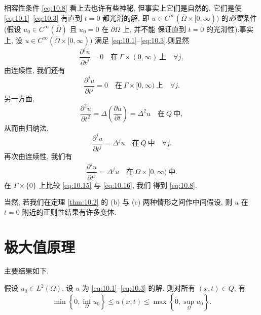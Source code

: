 \begin{remark}
\label{rem:10.4}
相容性条件 \eqref{eq:10.8} 看上去也许有些神秘, 但事实上它们是自然的.
它们是使 \eqref{eq:10.1}--\eqref{eq:10.3} 有直到 $t=0$ 都光滑的解, 即
$u\in C^\infty(\overline\Omega\times[0,\infty))$ 的\emph{必要}条件 (假设
$u_0\in C^\infty(\overline\Omega)$ 且 $u_0=0$ 在 $\partial\Omega$ 上, 并不能
保证直到 $t=0$ 的光滑性).事实上, 设 $u\in C^\infty(\overline\Omega\times
[0,\infty))$ 满足 \eqref{eq:10.1}--\eqref{eq:10.3}.则显然
\begin{equation}
\frac{\partial^ju}{\partial t^j}=0
\quad\text{在}\ \Gamma\times(0,\infty)\ \text{上}\quad\forall j,
\label{eq:10.15}
\end{equation}
由连续性, 我们还有
\begin{equation*}
\frac{\partial^ju}{\partial t^j}=0
\quad\text{在}\ \Gamma\times[0,\infty)\ \text{上}\quad\forall j.
\end{equation*}
另一方面,
\begin{equation*}
\frac{\partial^2u}{\partial t^2}
=\Delta\left(\frac{\partial u}{\partial t}\right)=\Delta^2u
\quad\text{在}\ Q\ \text{中},
\end{equation*}
从而由归纳法,
\begin{equation*}
\frac{\partial^ju}{\partial t^j}=\Delta^ju\quad\text{在}\ Q\ \text{中}
\quad\forall j.
\end{equation*}
再次由连续性, 我们有
\begin{equation}
\frac{\partial^ju}{\partial t^j}=\Delta^ju
\quad\text{在}\ \Omega\times[0,\infty)\ \text{中}.
\label{eq:10.16}
\end{equation}
在 $\Gamma\times\{0\}$ 上比较 \eqref{eq:10.15} 与 \eqref{eq:10.16}, 我们
得到 \eqref{eq:10.8}.
\end{remark}

\begin{remark}
\label{rem:10.5}
当然, 若我们在定理  \ref{thm:10.2} 的 (b) 与 (c) 两种情形之间作中间假设,
则 $u$ 在 $t=0$ 附近的正则性结果有许多变体.
\end{remark}
\section{极大值原理}
\label{sec:10.2}

主要结果如下.

\begin{keytheorem}
\label{thm:10.3}
假设 $u_0\in L^2(\Omega)$, 设 $u$ 为 \eqref{eq:10.1}--\eqref{eq:10.3} 的解.
则对所有 $(x,t)\in Q$, 有
\begin{equation*}
\min\left\{0,\inf_\Omega u_0\right\}\le u(x,t)\le\max\left\{0,
\sup_\Omega u_0\right\}.
\end{equation*}
\end{keytheorem}


